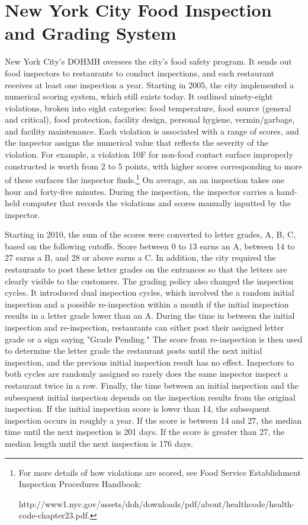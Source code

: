 \documentclass[12pt]{article}
\begin{document}
\section{New York City Food Inspection and Grading System}
\label{background}

New York City's DOHMH oversees the city's food safety program. It sends out food inspectors to restaurants to conduct inspections, and each restaurant receives at least one inspection a year. Starting in 2005, the city implemented a numerical scoring system, which still exists today. It outlined ninety-eight violations, broken into eight categories: food temperature, food source (general and critical), food protection, facility design, personal hygiene, vermin/garbage, and facility maintenance. Each violation is associated with a range of scores, and the inspector assigns the numerical value that reflects the severity of the violation. For example, a violation 10F for non-food contact surface improperly constructed is worth from 2 to 5 points, with higher scores corresponding to more of these surfaces the inspector finds.\footnote{For more details of how violations are scored, see Food Service Establishment Inspection Procedures Handbook: 

http://www1.nyc.gov/assets/doh/downloads/pdf/about/healthcode/health-code-chapter23.pdf. } On average, an an inspection takes one hour and forty-five minutes. During the inspection, the inspector carries a hand-held computer that records the violations and scores manually inputted by the inspector. 

Starting in 2010, the sum of the scores were converted to letter grades, A, B, C, based on the following cutoffs. Score between 0 to 13 earns an A, between 14 to 27 earns a B, and 28 or above earns a C. In addition, the city required the restaurants to post these letter grades on the entrances so that the letters are clearly visible to the customers. The grading policy also changed the inspection cycles. It introduced dual inspection cycles, which involved the a random initial inspection and a possible re-inspection within a month if the initial inspection results in a letter grade lower than an A. During the time in between the initial inspection and re-inspection, restaurants can either post their assigned letter grade or a sign saying "Grade Pending." The score from re-inspection is then used to determine the letter grade the restaurant posts until the next initial inspection, and the previous initial inspection result has no effect. Inspectors to both cycles are randomly assigned so rarely does the same inspector inspect a restaurant twice in a row. Finally, the time between an initial inspection and the subsequent initial inspection depends on the inspection results from the original inspection. If the initial inspection score is lower than 14, the subsequent inspection occurs in roughly a year. If the score is between 14 and 27, the median time until the next inspection is 201 days. If the score is greater than 27, the median length until the next inspection is 176 days. 
\end{document}
